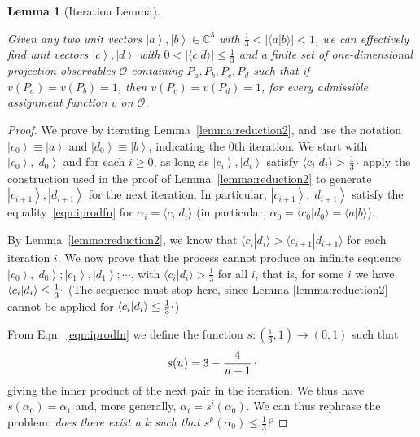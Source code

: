 \documentclass[%
 superscriptaddress,
 preprint,
 showpacs,
 showkeys,
 nofootinbib,
  amsmath,amssymb,
  aps,
  longbibliography,
  floatfix,
 ]{revtex4-1}
\newtheorem{lemma}{Lemma}
\theoremstyle{definition}
\newcommand{\C}{\mathbb{C}}
\newcommand{\ket}[1]{\left| #1 \right>}
\newcommand{\iprod}[2]{\langle #1 | #2 \rangle}
\begin{document}
\begin{lemma} [Iteration  Lemma]
	\label{lemma:reduction3}
	
	Given any two unit vectors $\ket{a},\ket{b}\in\C^3$ with $\frac{1}{3}< |\iprod{a}{b}|<1$, we can effectively find unit vectors $\ket{c},\ket{d}$ with $0<|\iprod{c}{d}|\le \frac{1}{3}$ and a finite set of {\color{blue}one-dimensional projection} observables $\mathcal{O}$ containing $P_a,P_b,P_{c},P_{d}$ such that if $v(P_a)=v(P_b)=1$, then $v(P_{c})=v(P_{d})=1$, for
every admissible assignment function  $v$  on $\mathcal{O}$.
\end{lemma}
\begin{proof}
	We prove by iterating Lemma~\ref{lemma:reduction2}, and use the notation $\ket{c_0}\equiv \ket{a}$ and $\ket{d_0}\equiv \ket{b}$, indicating the 0th iteration.
	We start with $\ket{c_0},\ket{d_0}$ and for each $i\ge 0$, as long as $\ket{c_{i}},\ket{d_{i}}$ satisfy $\iprod{c_{i}}{d_{i}}> \frac{1}{3}\raisebox{.8mm}{,}$ apply the construction used in the proof of Lemma~\ref{lemma:reduction2} to generate $\ket{c_{i+1}},\ket{d_{i+1}}$ for the next iteration. In  particular, $\ket{c_{i+1}},\ket{d_{i+1}}$  satisfy the equality~\eqref{eqn:iprodfn} for  $\alpha_i=\iprod{c_i}{d_i}$ (in particular, $\alpha_0=\iprod{c_0}{d_0}=\iprod{a}{b}$).
	
	
	By Lemma~\ref{lemma:reduction2}, we know that $\iprod{c_i}{d_i}>\iprod{c_{i+1}}{d_{i+1}}$ for each iteration $i$.
We now prove that	
	the process cannot produce an infinite sequence $\ket{c_0},\ket{d_0};\ket{c_1},\ket{d_1};\cdots$, with $\iprod{c_i}{d_i}>\frac{1}{3}$ for all $i$, that is, for
some  $i$ we have $\iprod{c_i}{d_i}\le\frac{1}{3}\raisebox{.8mm}{.}$
	(The sequence must stop here, since Lemma \ref{lemma:reduction2} cannot be applied for $\iprod{c_i}{d_i}\le \frac{1}{3}\raisebox{.8mm}{.}$)
	
	From Eqn.~\ref{eqn:iprodfn} we define the function $s:\left(\frac{1}{3},1\right)\to (0,1)$ such that $$s(u)=3-\frac{4}{u+1}\,\raisebox{.8mm}{,}$$ giving the inner product of the next pair in the iteration.
	We thus have $s(\alpha_0)=\alpha_1$ and, more generally, $\alpha_i=s^i(\alpha_0)$.
	We can thus rephrase the problem: \emph{does there exist a $k$ such that $s^k(\alpha_0)\le\frac{1}{3}$?}
	

\end{proof}
\end{document}
